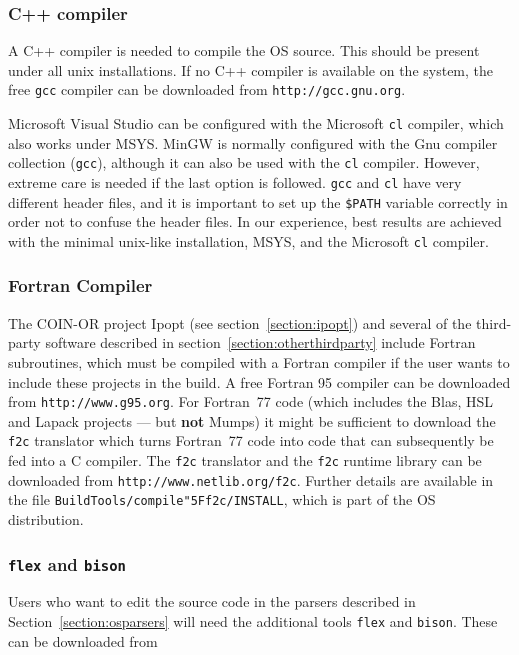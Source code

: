 \documentclass[11pt]{article}
\renewcommand{\_}{{\char"5F}}
\renewcommand{\{}{{\char"7B}}
\renewcommand{\}}{{\char"7D}}
\renewcommand{\^}{{\char"0D}}
\renewcommand{\'}{{\char"0D}}
\newcommand{\UrlFToC}{http://www.netlib.org/f2c}
\newcommand{\UrlGgs}{http://www.g95.org}
\newcommand{\UrlGcc}{http://gcc.gnu.org}
\begin{document}
\subsubsection{C++ compiler}\label{section:cpp}
A C++ compiler is needed to compile the OS source. This should be present 
under all unix installations. If no C++ compiler is available on the system, the free {\tt gcc} 
compiler can be downloaded from {\tt\UrlGcc}.

Microsoft Visual Studio can be configured with the Microsoft {\tt cl} compiler, which also 
works under MSYS. MinGW is normally configured with the Gnu compiler collection ({\tt gcc}), 
although it can also be used with the {\tt cl} compiler. However, extreme care is needed if the last option is followed. 
{\tt gcc} and {\tt cl} have very different header files, and it is important to set up the {\tt \$PATH}%
variable correctly in order not to confuse the header files. In our experience, best results are achieved with the 
minimal unix-like installation, MSYS, and the Microsoft {\tt cl} compiler.

\subsubsection{Fortran Compiler}\label{section:fortran}
The COIN-OR project Ipopt (see section~\ref{section:ipopt}) and several of the third-party 
software described in section~\ref{section:otherthirdparty} include Fortran subroutines, which must be 
compiled with a Fortran compiler if the user wants to include these projects in the build. A free Fortran 95 compiler
can be downloaded from {\tt\UrlGgs}. For Fortran~77 code (which includes the Blas,
HSL and Lapack projects --- but {\bf not} Mumps) 
it might be sufficient to download the {\tt f2c} translator
which turns Fortran~77 code into code that can subsequently be fed into a C compiler.
The {\tt f2c} translator and the {\tt f2c} runtime library can be downloaded from {\tt\UrlFToC}.
Further details are available in the file {\tt BuildTools/compile\_f2c/INSTALL}, which is part of the OS distribution.

\subsubsection{{\tt flex} and {\tt bison} }\label{section:flex}
Users who want to edit the source code in the parsers described in
Section~\ref{section:osparsers} will need the additional  tools
{\tt flex} and {\tt bison}.  These can be downloaded from
\end{document}
